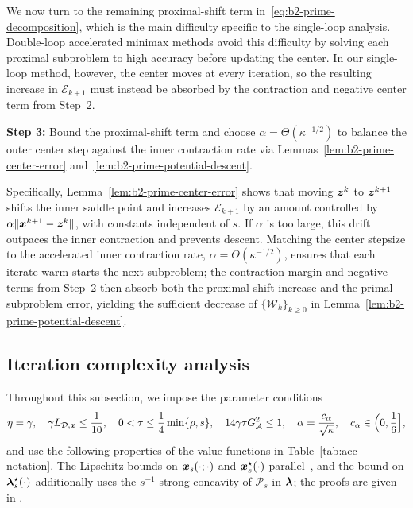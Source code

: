 We now turn to the remaining proximal-shift term
in~\eqref{eq:b2-prime-decomposition}, which is the main difficulty specific to
the single-loop analysis. Double-loop accelerated minimax
methods avoid this difficulty by
solving each proximal subproblem to high accuracy before updating the center.
In our single-loop method, however, the center moves at every iteration, so
the resulting increase in \(\mathcal E_{k+1}\) must instead be absorbed by the
contraction and negative center term from Step~2.

\begin{stepbox}
\textbf{Step 3:} Bound the proximal-shift term and choose
\(\alpha=\Theta(\kappa^{-1/2})\) to balance the outer center step against the
inner contraction rate via Lemmas~\ref{lem:b2-prime-center-error}
and~\ref{lem:b2-prime-potential-descent}.
\end{stepbox}

Specifically, Lemma~\ref{lem:b2-prime-center-error} shows that moving \(\bm{z}^k\)
to \(\bm{z}^{k+1}\) shifts the inner saddle point and increases \(\mathcal E_{k+1}\)
by an amount controlled by \(\alpha\|\bm{x}^{k+1}-\bm{z}^k\|\), with constants
independent of \(s\). If \(\alpha\) is too large, this drift outpaces the
inner contraction and prevents descent. Matching the center stepsize to the
accelerated inner contraction rate, \(\alpha=\Theta(\kappa^{-1/2})\), ensures
that each iterate warm-starts the next subproblem; the contraction margin and
negative terms from Step~2 then absorb both the proximal-shift increase and the
primal-subproblem error, yielding the sufficient decrease of
\(\{\mathcal W_k\}_{k\ge0}\) in Lemma~\ref{lem:b2-prime-potential-descent}.

\subsection{Iteration complexity analysis}
\label{subsec:fast-lralm-analysis}
Throughout this subsection, we impose the parameter conditions
\begin{equation}
    \eta=\gamma,\quad \gamma L_{\mathcal{D},\bm{x}}\le\frac{1}{10},\quad
    0<\tau\le\frac14\min\{\rho,s\},\quad 14\gamma\tau G_{\mathcal{A}}^2\le1,\quad
    \alpha=\frac{c_\alpha}{\sqrt{\kappa}},\quad c_\alpha\in\Bigl(0,\frac16\Bigr],
    \label{eq:b2-prime-stepsizes}
\end{equation}
and use the following properties of the value functions in
Table~\ref{tab:acc-notation}. The Lipschitz bounds on \(\bm{x}_s(\cdot;\cdot)\)
and \(\bm{x}_s^\star(\cdot)\) parallel~\cite[Lemma~B.2]{zhang2020smoothed}, and
the bound on \(\bm{\lambda}_s^\star(\cdot)\) additionally uses the
\(s^{-1}\)-strong concavity of \(\mathcal P_s\) in \(\bm{\lambda}\); the proofs
are given in .

